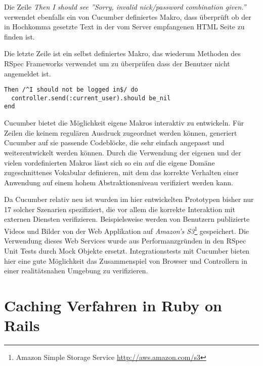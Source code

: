 Die Zeile \textit{Then I should see ''Sorry, invalid nick/password
  combination given.''} verwendet ebenfalls ein von Cucumber
definiertes Makro, dass überprüft ob der in Hochkomma gesetzte Text in
der vom Server empfangenen HTML Seite zu finden ist.

Die letzte Zeile ist ein selbst definiertes Makro, das wiederum
Methoden des RSpec Frameworks verwendet um zu überprüfen dass der
Benutzer nicht angemeldet ist.

\begin{lstlisting}
Then /^I should not be logged in$/ do
  controller.send(:current_user).should be_nil
end
\end{lstlisting}

Cucumber bietet die Möglichkeit eigene Makros interaktiv zu
entwickeln. Für Zeilen die keinem regulären Ausdruck zugeordnet werden
können, generiert Cucumber auf sie passende Codeblöcke, die sehr
einfach angepasst und weiterentwickelt werden können. Durch die
Verwendung der eigenen und der vielen vordefinierten Makros lässt sich
so ein auf die eigene Domäne zugeschnittenes Vokabular definieren, mit
dem das korrekte Verhalten einer Anwendung auf einem hohem
Abstraktionsniveau verifiziert werden kann.

Da Cucumber relativ neu ist wurden im hier entwickelten Prototypen
bisher nur 17 solcher Szenarien spezifiziert, die vor allem die
korrekte Interaktion mit externen Diensten
verifizieren. Beispielsweise werden von Benutzern publizierte Videos
und Bilder von der Web Applikation auf \textit{Amazon's
  S3}\footnote{Amazon Simple Storage Service
  \url{http://aws.amazon.com/s3}} gespeichert. Die Verwendung dieses
Web Services wurde aus Performanzgründen in den RSpec Unit Tests durch
Mock Objekte ersetzt. Integrationstests mit Cucumber bieten hier eine
gute Möglichkeit das Zusammenspiel von Browser und Controllern in
einer realitätsnahen Umgebung zu verifizieren.

\section{Caching Verfahren in Ruby on Rails}

